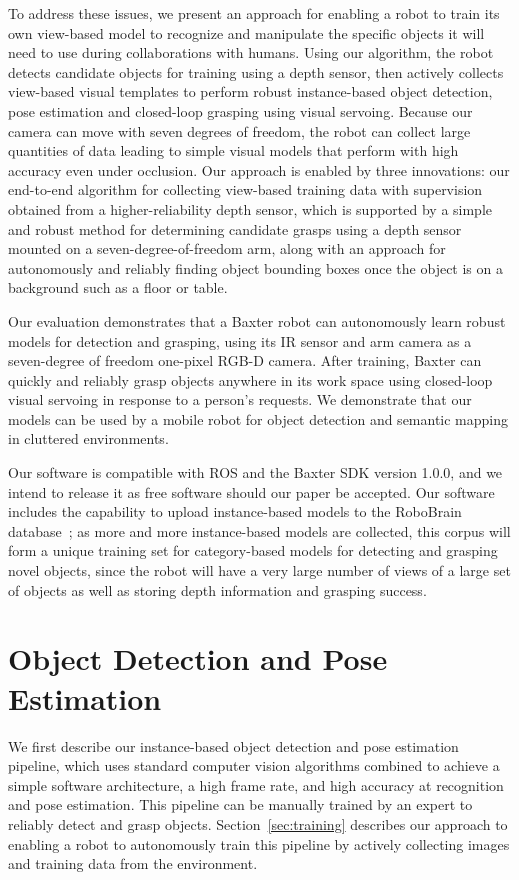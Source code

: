 \documentclass[conference]{IEEEtran}
\begin{document}
To address these issues, we present an approach for enabling a robot
to train its own view-based model to recognize and manipulate the
specific objects it will need to use during collaborations with
humans.  Using our algorithm, the robot detects candidate objects for
training using a depth sensor, then actively collects view-based
visual templates to perform robust instance-based object detection,
pose estimation and closed-loop grasping using visual servoing.
Because our camera can move with seven degrees of freedom, the robot
can collect large quantities of data leading to simple visual models
that perform with high accuracy even under occlusion.  Our approach is
enabled by three innovations: our end-to-end algorithm for collecting
view-based training data with supervision obtained from a
higher-reliability depth sensor, which is supported by a simple and
robust method for determining candidate grasps using a depth sensor
mounted on a seven-degree-of-freedom arm, along with an approach for
autonomously and reliably finding object bounding boxes once the
object is on a background such as a floor or table.

Our evaluation demonstrates that a Baxter robot can autonomously learn
robust models for detection and grasping, using its IR sensor and arm
camera as a seven-degree of freedom one-pixel RGB-D camera.  After
training, Baxter can quickly and reliably grasp objects anywhere in
its work space using closed-loop visual servoing in response to a
person's requests.  We demonstrate that our models can be used by a
mobile robot for object detection and semantic mapping in cluttered
environments.

Our software is compatible with ROS and the Baxter SDK version 1.0.0,
and we intend to release it as free software should our paper be
accepted.  Our software includes the capability to upload
instance-based models to the RoboBrain database~\citep{x}; as more and
more instance-based models are collected, this corpus will form a
unique training set for category-based models for detecting and
grasping novel objects, since the robot will have a very large number
of views of a large set of objects as well as storing depth
information and grasping success.


\section{Object Detection and Pose Estimation}

We first describe our instance-based object detection and pose
estimation pipeline, which uses standard computer vision algorithms
combined to achieve a simple software architecture, a high frame rate,
and high accuracy at recognition and pose estimation.  This pipeline
can be manually trained by an expert to reliably detect and grasp
objects.  Section~\ref{sec:training} describes our approach to
enabling a robot to autonomously train this pipeline by actively
collecting images and training data from the environment.
\end{document}
